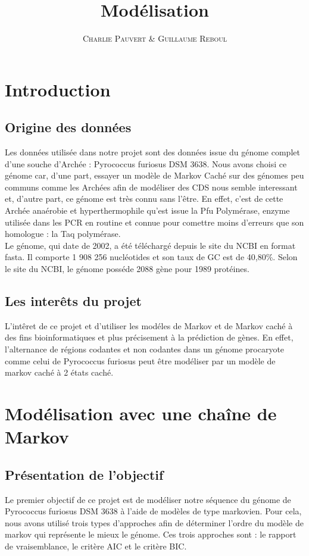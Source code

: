 \documentclass[12pt,a4paper]{article}
\title{Modélisation}
\author{\textsc{Charlie Pauvert} \& \textsc{Guillaume Reboul}}
\begin{document}
\section{Introduction}
\subsection{Origine des données}
Les données utilisée dans notre projet sont des données issue du génome complet d'une souche d'Archée : Pyrococcus furiosus DSM 3638.
Nous avons choisi ce génome car, d'une part, essayer un modèle de Markov Caché sur des génomes peu communs comme les Archées afin de modéliser des CDS nous semble interessant et, d'autre part, ce génome est très connu sans l'être. En effet, c'est de cette Archée anaérobie et hyperthermophile qu'est issue la Pfu Polymérase, enzyme utilisée dans les PCR en routine et connue pour comettre moins d'erreurs que son homologue : la Taq polymérase.
\\ \indent
Le génome, qui date de 2002, a été téléchargé depuis le site du NCBI en format fasta. Il comporte 1 908 256 nucléotides et son taux de GC est de 40,80\%. Selon le site du NCBI, le génome posséde 2088 gène pour 1989 protéines.
\subsection{Les interêts du projet}
L'intêret de ce projet et d'utiliser les modéles de Markov et de Markov caché à des fins bioinformatiques et plus précisement à la prédiction de gènes. En effet, l'alternance de régions codantes et non codantes dans un génome procaryote comme celui de Pyrococcus furiosus peut être modéliser par un modèle de markov caché à 2 états caché.

\section{Modélisation avec une chaîne de Markov}
\subsection{Présentation de l'objectif}
Le premier objectif de ce projet est de modéliser notre séquence du génome de Pyrococcus furiosus DSM 3638 à l'aide de modèles de type markovien.
Pour cela, nous avons utilisé trois types d'approches afin de déterminer l'ordre du modèle de markov qui représente le mieux le génome.
Ces trois approches sont : le rapport de vraisemblance, le critère AIC et le critère BIC.
\end{document}
